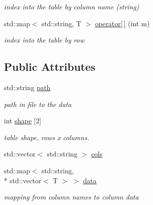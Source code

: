 \begin{DoxyCompactItemize}
\begin{DoxyCompactList}\small\item\em index into the table by column name (string) \end{DoxyCompactList}\item 
\hypertarget{classh5wrap_1_1_homogenous_type_table_a777f6bdc03111b5a7d8fde59e184e26c}{std\-::map$<$ std\-::string, T $>$ \hyperlink{classh5wrap_1_1_homogenous_type_table_a777f6bdc03111b5a7d8fde59e184e26c}{operator\mbox{[}$\,$\mbox{]}} (int m)}\label{classh5wrap_1_1_homogenous_type_table_a777f6bdc03111b5a7d8fde59e184e26c}

\begin{DoxyCompactList}\small\item\em index into the table by row \end{DoxyCompactList}\end{DoxyCompactItemize}
\subsection*{Public Attributes}
\begin{DoxyCompactItemize}
\item 
\hypertarget{classh5wrap_1_1_homogenous_type_table_a6da460e4b94719f9ff5fe0d17e8859d7}{std\-::string \hyperlink{classh5wrap_1_1_homogenous_type_table_a6da460e4b94719f9ff5fe0d17e8859d7}{path}}\label{classh5wrap_1_1_homogenous_type_table_a6da460e4b94719f9ff5fe0d17e8859d7}

\begin{DoxyCompactList}\small\item\em path in file to the data \end{DoxyCompactList}\item 
\hypertarget{classh5wrap_1_1_homogenous_type_table_ab0e03ddbee134e775ea6fa389897fc8b}{int \hyperlink{classh5wrap_1_1_homogenous_type_table_ab0e03ddbee134e775ea6fa389897fc8b}{shape} \mbox{[}2\mbox{]}}\label{classh5wrap_1_1_homogenous_type_table_ab0e03ddbee134e775ea6fa389897fc8b}

\begin{DoxyCompactList}\small\item\em table shape, rows x columns. \end{DoxyCompactList}\item 
std\-::vector$<$ std\-::string $>$ \hyperlink{classh5wrap_1_1_homogenous_type_table_a8b60fa54475f44bea26caab0137d8507}{cols}
\item 
\hypertarget{classh5wrap_1_1_homogenous_type_table_a06c1889b5469abf303923b17b78a381b}{std\-::map$<$ std\-::string, \\*
std\-::vector$<$ T $>$ $>$ \hyperlink{classh5wrap_1_1_homogenous_type_table_a06c1889b5469abf303923b17b78a381b}{data}}\label{classh5wrap_1_1_homogenous_type_table_a06c1889b5469abf303923b17b78a381b}

\begin{DoxyCompactList}\small\item\em mapping from column names to column data \end{DoxyCompactList}\end{DoxyCompactItemize}


